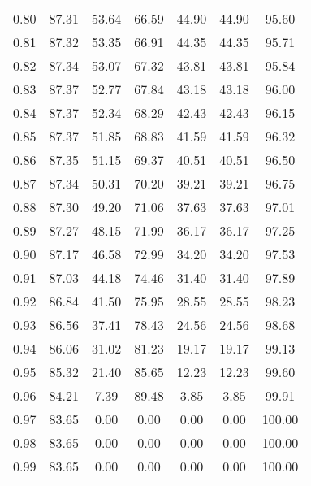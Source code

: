 \begin{tabular}{|c|c|c|c|c|c|c|}
      0.80 &     87.31 &     53.64 &      66.59 &   44.90 &      44.90 &         95.60 \\
      0.81 &     87.32 &     53.35 &      66.91 &   44.35 &      44.35 &         95.71 \\
      0.82 &     87.34 &     53.07 &      67.32 &   43.81 &      43.81 &         95.84 \\
      0.83 &     87.37 &     52.77 &      67.84 &   43.18 &      43.18 &         96.00 \\
      0.84 &     87.37 &     52.34 &      68.29 &   42.43 &      42.43 &         96.15 \\
      0.85 &     87.37 &     51.85 &      68.83 &   41.59 &      41.59 &         96.32 \\
      0.86 &     87.35 &     51.15 &      69.37 &   40.51 &      40.51 &         96.50 \\
      0.87 &     87.34 &     50.31 &      70.20 &   39.21 &      39.21 &         96.75 \\
      0.88 &     87.30 &     49.20 &      71.06 &   37.63 &      37.63 &         97.01 \\
      0.89 &     87.27 &     48.15 &      71.99 &   36.17 &      36.17 &         97.25 \\
      0.90 &     87.17 &     46.58 &      72.99 &   34.20 &      34.20 &         97.53 \\
      0.91 &     87.03 &     44.18 &      74.46 &   31.40 &      31.40 &         97.89 \\
      0.92 &     86.84 &     41.50 &      75.95 &   28.55 &      28.55 &         98.23 \\
      0.93 &     86.56 &     37.41 &      78.43 &   24.56 &      24.56 &         98.68 \\
      0.94 &     86.06 &     31.02 &      81.23 &   19.17 &      19.17 &         99.13 \\
      0.95 &     85.32 &     21.40 &      85.65 &   12.23 &      12.23 &         99.60 \\
      0.96 &     84.21 &      7.39 &      89.48 &    3.85 &       3.85 &         99.91 \\
      0.97 &     83.65 &      0.00 &       0.00 &    0.00 &       0.00 &        100.00 \\
      0.98 &     83.65 &      0.00 &       0.00 &    0.00 &       0.00 &        100.00 \\
      0.99 &     83.65 &      0.00 &       0.00 &    0.00 &       0.00 &        100.00 \\
\bottomrule
\end{tabular}

